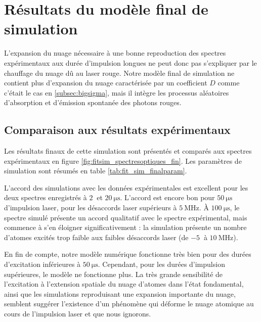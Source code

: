 \clearpage
\section{Résultats du modèle final de simulation}
\noindent L'expansion du nuage nécessaire à une bonne reproduction des spectres expérimentaux aux durée d'impulsion longues ne peut donc pas s'expliquer par le chauffage du nuage dû au laser rouge.
Notre modèle final de simulation ne contient plus d'expansion du nuage caractérisée par un coefficient $D$ comme c'était le cas en \ref{subsec:bigsigma}, mais il intègre les processus aléatoires d'absorption et d'émission spontanée des photons rouges.

\subsection{Comparaison aux résultats expérimentaux}
\noindent Les résultats finaux de cette simulation sont présentés et comparés aux spectres expérimentaux en figure \eqref{fig:fitsim_spectresoptiques_fin}.
Les paramètres de simulation sont résumés en table \eqref{tab:fit_sim_finalparam}.

L'accord des simulations avec les données expérimentales est excellent pour les deux spectres enregistrés à $\SI{2}{}$ et $\SI{20}{\us}$.
L'accord est encore bon pour $\SI{50}{\us}$ d'impulsion laser, pour les désaccords laser supérieurs à $\SI{5}{\MHz}$.
\`A $\SI{100}{\us}$, le spectre simulé présente un accord qualitatif avec le spectre expérimental, mais commence à s'en éloigner significativement :
la simulation présente un nombre d'atomes excités trop faible aux faibles désaccords laser (de $\SI{-5}{}$ à $\SI{10}{\MHz}$). %

En fin de compte, notre modèle numérique fonctionne très bien pour des durées d'excitation inférieures à $\SI{50}{\us}$.
Cependant, pour les durées d'impulsion supérieures, le modèle ne fonctionne plus.
La très grande sensibilité de l'excitation à l'extension spatiale du nuage d'atomes dans l'état fondamental, ainsi que les simulations reproduisant une expansion importante du nuage, semblent suggérer l'existence d'un phénomène qui déforme le nuage atomique au cours de l'impulsion laser et que nous ignorons.%

